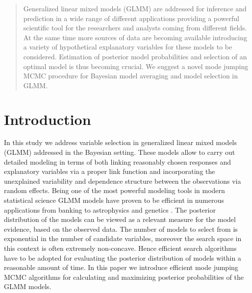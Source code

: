 \documentclass[a0,portrait]{a0poster}
\begin{document}
\begin{multicols}{2} %


\color{Navy} %

\begin{abstract}


Generalized linear mixed models (GLMM) are addressed for inference and prediction in a wide range of different applications providing a powerful scientific tool for the researchers and analysts coming from different fields. At the same time more sources of data are becoming available introducing a variety of hypothetical explanatory variables for these models to be considered. Estimation of posterior model probabilities and selection of an optimal model is thus becoming crucial. We suggest a novel mode jumping MCMC procedure for Bayesian model averaging and model selection in GLMM.

\end{abstract}


\color{SaddleBrown} %

\section*{Introduction}

In this study we address variable selection in generalized linear mixed models (GLMM) addressed in the Bayesian setting. These models allow to carry out detailed modeling in terms of both linking reasonably chosen responses and explanatory variables via a proper link function and incorporating the unexplained variability and dependence structure between the observations via random effects. Being one of the most powerful modeling tools in modern statistical science GLMM models have proven to be efficient in numerous applications from banking to astrophysics and genetics \cite{Hubin2016}. The posterior distribution of the models  can be viewed as a  relevant measure for the model evidence, based on the observed data. The number of models to select from is exponential in the number of candidate variables, moreover the search space in this context is often extremely non-concave. Hence efficient search algorithms have to be adopted for evaluating the posterior distribution of models within a reasonable amount of time. In this paper we introduce efficient mode jumping MCMC algorithms for calculating and maximizing posterior probabilities of the GLMM models. 


\end{multicols}
\end{document}

